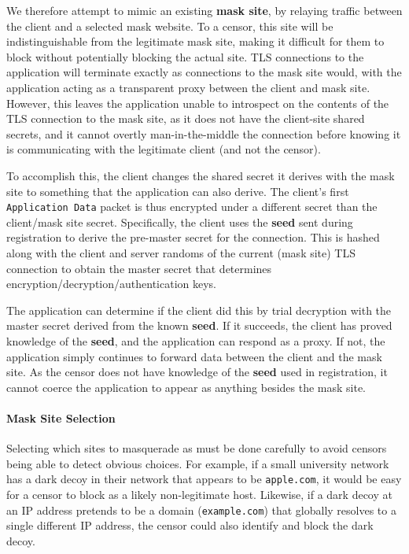 \documentclass[letterpaper,twocolumn,10pt]{article}
\begin{document}
We therefore attempt to mimic an existing \textbf{mask site}, by relaying
traffic between the client and a selected mask website. To a censor, this site
will be indistinguishable from the legitimate mask site, making it difficult for
them to block without potentially blocking the actual site. TLS connections to the
application will terminate exactly as connections to the mask site would, with the
application acting as a transparent proxy between the client and mask site.
However, this leaves the application unable to introspect on the contents of the
TLS connection to the mask site, as it does not have the client-site shared
secrets, and it cannot overtly man-in-the-middle the connection before knowing
it is communicating with the legitimate client (and not the censor).


To accomplish this, the client changes the shared secret it derives with the
mask site to something that the application can also derive. The client's first
\texttt{Application Data} packet is thus encrypted under a different secret than
the client/mask site secret. Specifically, the client uses the \textbf{seed}
sent during registration to derive the pre-master secret for the connection.
This is hashed along with the client and server randoms of the current (mask
site) TLS connection to obtain the master secret that determines
encryption/decryption/authentication keys.

The application can determine if the client did this by trial decryption with
the master secret derived from the known \textbf{seed}. If it succeeds, the
client has proved knowledge of the \textbf{seed}, and the application can
respond as a proxy. If not, the application simply continues to forward data
between the client and the mask site. As the censor does not have knowledge of
the \textbf{seed} used in registration, it cannot coerce the application to
appear as anything besides the mask site.


\paragraph{Mask Site Selection}

Selecting which sites to masquerade as must be done carefully to avoid censors
being able to detect obvious choices. For example, if a small university network
has a dark decoy in their network that appears to be \texttt{apple.com}, it
would be easy for a censor to block as a likely non-legitimate host. Likewise,
if a dark decoy at an IP address pretends to be a domain (\texttt{example.com}) that
globally resolves to a single different IP address, the censor could also
identify and block the dark decoy.
\end{document}
